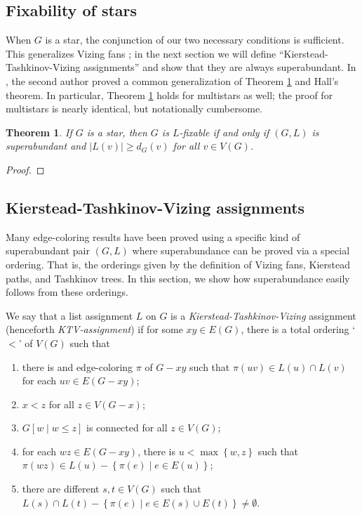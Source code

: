 \documentclass[12pt]{article}
\theoremstyle{plain}
\newtheorem{thm}{Theorem}[section]
\theoremstyle{definition}
\theoremstyle{remark}
\newcommand{\set}[1]{\left\{ #1 \right\}}
\newcommand{\setbs}[2]{\left\{ #1 \mid #2 \right\}}
\newcommand{\brackets}[1]{\left[ #1 \right]}
\begin{document}
\subsection{Fixability of stars}
When $G$ is a star, the conjunction of our two necessary conditions is sufficient. This generalizes Vizing fans \cite{Vizing76}; in the next section we will define ``Kierstead-Tashkinov-Vizing assignments'' and show that they are always superabundant.  In \cite{HallGame}, the second author proved a common generalization of Theorem \ref{FixabilityOfStars} and Hall's theorem.  In particular, Theorem \ref{FixabilityOfStars} holds for multistars as well; the proof for multistars is nearly identical, but notationally cumbersome.

\begin{thm}\label{FixabilityOfStars}
If $G$ is a star, then $G$ is $L$-fixable if and only if $(G, L)$ is superabundant and $|L(v)| \ge d_G(v)$ for all $v \in V(G)$.
\end{thm}
\begin{proof}
\end{proof}

\subsection{Kierstead-Tashkinov-Vizing assignments}
Many edge-coloring results have been proved using a specific kind of
superabundant pair $(G, L)$ where superabundance can be proved via a special
ordering. That is, the orderings given by the definition of Vizing fans,
Kierstead paths, and Tashkinov trees.  In this section, we show how
superabundance easily follows from these orderings.

We say that a list assignment $L$ on $G$ is a \emph{Kierstead-Tashkinov-Vizing} assignment (henceforth \emph{KTV-assignment}) if for some $xy \in E(G)$, there is a total ordering `$<$' of $V(G)$ such that

\begin{enumerate}
\item there is and edge-coloring $\pi$ of $G-xy$ such that $\pi(uv) \in L(u) \cap L(v)$ for each $uv \in E(G - xy)$; 
\item $x < z$ for all $z \in V(G - x)$; 
\item $G\brackets{w \mid w \le z}$ is connected for all $z \in V(G)$; 
\item for each $wz \in E(G - xy)$, there is $u < \max\set{w, z}$ such that $\pi(wz) \in L(u) - \setbs{\pi(e)}{e \in E(u)}$;
\item there are different $s, t \in V(G)$ such that $L(s) \cap L(t) - \setbs{\pi(e)}{e \in E(s) \cup E(t)} \ne \emptyset$.
\end{enumerate}
\end{document}
